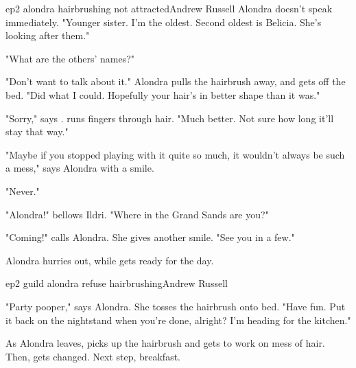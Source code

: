 \documentclass{book}
\begin{document}
\begin{childnode}{ep2 alondra hairbrushing not attracted}{Andrew Russell}
    Alondra doesn't speak immediately. "Younger sister. I'm the oldest. Second oldest is Belicia. She's looking after them."

    "What are the others' names?"

    "Don't want to talk about it." Alondra pulls the hairbrush away, and gets off the bed. "Did what I could. Hopefully your hair's in better shape than it was."

    "Sorry," says \name{}. \HeShe{} runs \hisher{} fingers through \hisher{}  hair. "Much better. Not sure how long it'll stay that way."

    "Maybe if you stopped playing with it quite so much, it wouldn't always be such a mess," says Alondra with a smile.

    "Never."

    "Alondra!" bellows Ildri. "Where in the Grand Sands are you?"

    "Coming!" calls Alondra. She gives \name{} another smile. "See you in a few."

    Alondra hurries out, while \name{} gets ready for the day.

\end{childnode}

\begin{childnode}{ep2 guild alondra refuse hairbrushing}{Andrew Russell}

    "Party pooper," says Alondra. She tosses the hairbrush onto \names{} bed. "Have fun. Put it back on the nightstand when you're done, alright? I'm heading for the kitchen."

    As Alondra leaves, \name{} picks up the hairbrush and gets to work on \hisher{} mess of hair. Then, \heshe{} gets changed. Next step, breakfast.

\end{childnode}
\end{document}

